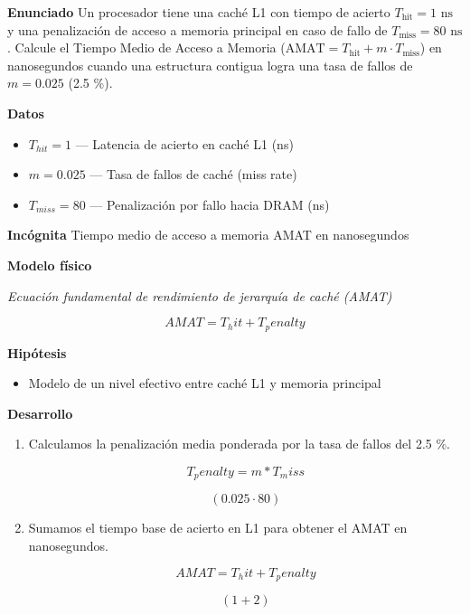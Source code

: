 \documentclass{book}
\begin{document}
\begin{tcolorbox}[title={Problema resuelto}, studiumworked, breakable]

\noindent\textbf{Enunciado}
Un procesador tiene una caché L1 con tiempo de acierto \(T_{\text{hit}} = 1\text{ ns}\) y una penalización de acceso a memoria principal en caso de fallo de \(T_{\text{miss}} = 80\text{ ns}\). Calcule el Tiempo Medio de Acceso a Memoria (\(\text{AMAT} = T_{\text{hit}} + m \cdot T_{\text{miss}}\)) en nanosegundos cuando una estructura contigua logra una tasa de fallos de \(m = 0.025\) (2.5 \%).

\noindent\textbf{Datos}
\begin{itemize}
\item $T_{hit} = 1$ — Latencia de acierto en caché L1 (ns)
\item $m = 0.025$ — Tasa de fallos de caché (miss rate)
\item $T_{miss} = 80$ — Penalización por fallo hacia DRAM (ns)
\end{itemize}

\noindent\textbf{Incógnita}
Tiempo medio de acceso a memoria AMAT en nanosegundos

\noindent\textbf{Modelo físico}

\noindent\textit{Ecuación fundamental de rendimiento de jerarquía de caché (AMAT)}

\[
AMAT = T_hit + T_penalty
\]

\noindent\textbf{Hipótesis}
\begin{itemize}
\item Modelo de un nivel efectivo entre caché L1 y memoria principal
\end{itemize}

\noindent\textbf{Desarrollo}
\begin{enumerate}
\item
Calculamos la penalización media ponderada por la tasa de fallos del 2.5 \%.

\[
T_penalty = m * T_miss
\]

\[
\left(0.025\cdot 80\right)
\]
\item
Sumamos el tiempo base de acierto en L1 para obtener el AMAT en nanosegundos.

\[
AMAT = T_hit + T_penalty
\]

\[
\left(1+2\right)
\]
\end{enumerate}


\end{tcolorbox}
\end{document}
